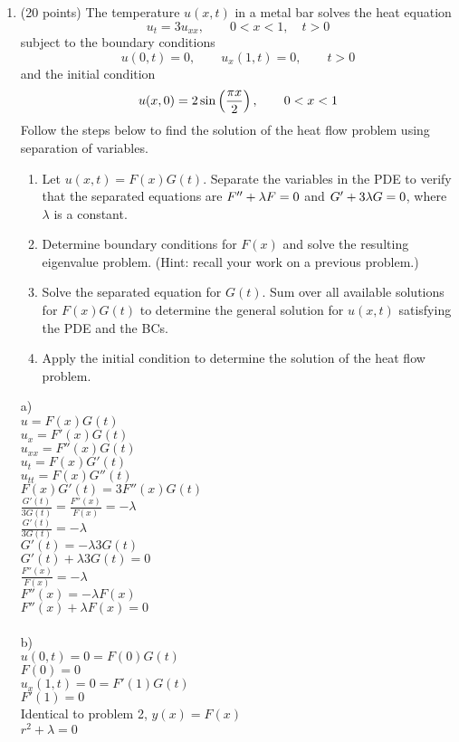 \documentclass{article}
\begin{document}
\begin{enumerate}
\bigskip
\item (20 points) The temperature $u(x,t)$ in a metal bar solves the heat equation
\[
u_t=3u_{xx},\qquad 0<x<1,\quad t>0
\]
subject to the boundary conditions
\[
u(0,t)=0,\qquad u_x(1,t)=0,\qquad t>0
\]
and the initial condition
\[
u(x,0)=2\sin\left({\pi x\over2}\right),\qquad 0<x<1
\]
Follow the steps below to find the solution of the heat flow problem using separation of variables.
\begin{enumerate}
\item Let $u(x,t)=F(x)G(t)$.  Separate the variables in the PDE to verify that the separated equations are $F\sp{\prime\prime}+\lambda F=0$ and $G\sp\prime+3\lambda G=0$, where $\lambda$ is a constant.
\item Determine boundary conditions for $F(x)$ and solve the resulting eigenvalue problem.  (Hint: recall your work on a previous problem.)
\item Solve the separated equation for $G(t)$.  Sum over all available solutions for $F(x)G(t)$ to determine the general solution for $u(x,t)$ satisfying the PDE and the BCs.
\item Apply the initial condition to determine the solution of the heat flow problem.
\end{enumerate}
a)
\\$u=F(x)G(t)$
\\$u_x=F'(x)G(t)$
\\$u_{xx}=F''(x)G(t)$
\\$u_t=F(x)G'(t)$
\\$u_{tt}=F(x)G''(t)$
\\$F(x)G'(t)=3F''(x)G(t)$
\\$\frac{G'(t)}{3G(t)}=\frac{F''(x)}{F(x)}=-\lambda$
\\$\frac{G'(t)}{3G(t)}=-\lambda$
\\$G'(t)=-\lambda3G(t)$
\\$G'(t)+\lambda3G(t)=0$
\\$\frac{F''(x)}{F(x)}=-\lambda$
\\$F''(x)=-\lambda F(x)$
\\$F''(x)+\lambda F(x)=0$
\\
\\b)
\\$u(0,t)=0=F(0)G(t)$
\\$F(0)=0$
\\$u_x(1,t)=0=F'(1)G(t)$
\\$F'(1)=0$
\\Identical to problem 2, $y(x)=F(x)$
\\$r^2+\lambda=0$

\end{enumerate}
\end{document}

